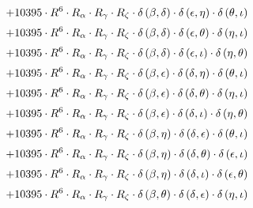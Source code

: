 \begin{subequations}
\begin{gather}
 \\[0.2em] \notag 		 + 10395 \cdot R^{6} \cdot R_{\alpha{}} \cdot R_{\gamma{}} \cdot R_{\zeta{}} \cdot \delta{}\left(\beta{}, \delta{}\right) \cdot \delta{}\left(\epsilon{}, \eta{}\right) \cdot \delta{}\left(\theta{}, \iota{}\right) 
 \\[0.2em] \notag 		 + 10395 \cdot R^{6} \cdot R_{\alpha{}} \cdot R_{\gamma{}} \cdot R_{\zeta{}} \cdot \delta{}\left(\beta{}, \delta{}\right) \cdot \delta{}\left(\epsilon{}, \theta{}\right) \cdot \delta{}\left(\eta{}, \iota{}\right) 
 \\[0.2em] \notag 		 + 10395 \cdot R^{6} \cdot R_{\alpha{}} \cdot R_{\gamma{}} \cdot R_{\zeta{}} \cdot \delta{}\left(\beta{}, \delta{}\right) \cdot \delta{}\left(\epsilon{}, \iota{}\right) \cdot \delta{}\left(\eta{}, \theta{}\right) 
 \\[0.2em] \notag 		 + 10395 \cdot R^{6} \cdot R_{\alpha{}} \cdot R_{\gamma{}} \cdot R_{\zeta{}} \cdot \delta{}\left(\beta{}, \epsilon{}\right) \cdot \delta{}\left(\delta{}, \eta{}\right) \cdot \delta{}\left(\theta{}, \iota{}\right) 
 \\[0.2em] \notag 		 + 10395 \cdot R^{6} \cdot R_{\alpha{}} \cdot R_{\gamma{}} \cdot R_{\zeta{}} \cdot \delta{}\left(\beta{}, \epsilon{}\right) \cdot \delta{}\left(\delta{}, \theta{}\right) \cdot \delta{}\left(\eta{}, \iota{}\right) 
 \\[0.2em] \notag 		 + 10395 \cdot R^{6} \cdot R_{\alpha{}} \cdot R_{\gamma{}} \cdot R_{\zeta{}} \cdot \delta{}\left(\beta{}, \epsilon{}\right) \cdot \delta{}\left(\delta{}, \iota{}\right) \cdot \delta{}\left(\eta{}, \theta{}\right) 
 \\[0.2em] \notag 		 + 10395 \cdot R^{6} \cdot R_{\alpha{}} \cdot R_{\gamma{}} \cdot R_{\zeta{}} \cdot \delta{}\left(\beta{}, \eta{}\right) \cdot \delta{}\left(\delta{}, \epsilon{}\right) \cdot \delta{}\left(\theta{}, \iota{}\right) 
 \\[0.2em] \notag 		 + 10395 \cdot R^{6} \cdot R_{\alpha{}} \cdot R_{\gamma{}} \cdot R_{\zeta{}} \cdot \delta{}\left(\beta{}, \eta{}\right) \cdot \delta{}\left(\delta{}, \theta{}\right) \cdot \delta{}\left(\epsilon{}, \iota{}\right) 
 \\[0.2em] \notag 		 + 10395 \cdot R^{6} \cdot R_{\alpha{}} \cdot R_{\gamma{}} \cdot R_{\zeta{}} \cdot \delta{}\left(\beta{}, \eta{}\right) \cdot \delta{}\left(\delta{}, \iota{}\right) \cdot \delta{}\left(\epsilon{}, \theta{}\right) 
 \\[0.2em] \notag 		 + 10395 \cdot R^{6} \cdot R_{\alpha{}} \cdot R_{\gamma{}} \cdot R_{\zeta{}} \cdot \delta{}\left(\beta{}, \theta{}\right) \cdot \delta{}\left(\delta{}, \epsilon{}\right) \cdot \delta{}\left(\eta{}, \iota{}\right) 

\end{gather}
\end{subequations}
